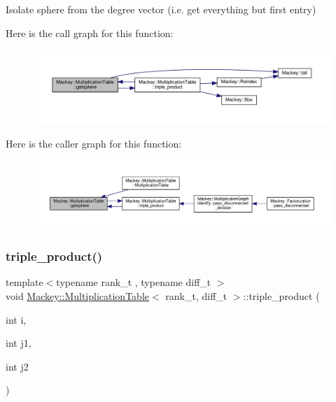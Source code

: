 Isolate sphere from the degree vector (i.\+e. get everything but first entry) 

Here is the call graph for this function\+:\nopagebreak
\begin{figure}[H]
\begin{center}
\leavevmode
\includegraphics[width=350pt]{classMackey_1_1MultiplicationTable_ad4245f4a8122f0661f969498ef53f999_cgraph}
\end{center}
\end{figure}
Here is the caller graph for this function\+:\nopagebreak
\begin{figure}[H]
\begin{center}
\leavevmode
\includegraphics[width=350pt]{classMackey_1_1MultiplicationTable_ad4245f4a8122f0661f969498ef53f999_icgraph}
\end{center}
\end{figure}
\mbox{\label{classMackey_1_1MultiplicationTable_ae2801cd35f426f10c89ab8addb75f829}} 
\subsubsection{\texorpdfstring{triple\+\_\+product()}{triple\_product()}}
{\footnotesize\ttfamily template$<$typename rank\+\_\+t , typename diff\+\_\+t $>$ \\
void \hyperlink{classMackey_1_1MultiplicationTable}{Mackey\+::\+Multiplication\+Table}$<$ rank\+\_\+t, diff\+\_\+t $>$\+::triple\+\_\+product (\begin{DoxyParamCaption}\item[{int}]{i,  }\item[{int}]{j1,  }\item[{int}]{j2 }\end{DoxyParamCaption})\hspace{0.3cm}{\ttfamily [protected]}}



